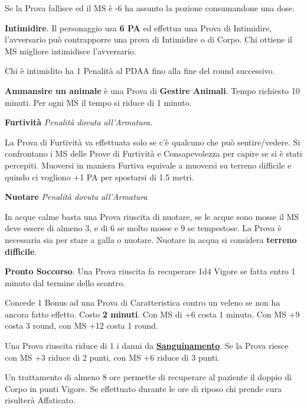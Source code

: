 \documentclass[12pt,a4paper,twoside,openany]{book}
\begin{document}
\begin{multicols}{2}
Se la Prova fallisce ed il MS è -6 ha assunto la pozione consumandone una dose.

\medskip

\textbf{Intimidire}. Il personaggio usa \textbf{6 PA} ed effettua una Prova di Intimidire, l'avversario può contrapporre una prova di Intimidire o di Corpo. Chi ottiene il MS migliore intimidisce l'avversario.

Chi è intimidito ha 1 Penalità al PDAA fino alla fine del round successivo.

\medskip

\textbf{Ammansire un animale} è una Prova di \textbf{Gestire Animali}. Tempo richiesto 10 minuti. Per ogni MS il tempo si riduce di 1 minuto.

\medskip

\textbf{Furtività}  \textit{Penalità dovuta all'Armatura.}

La Prova di Furtività va effettuata solo se c'è qualcuno che può sentire/vedere. Si confrontano i MS delle Prove di Furtività e Consapevolezza per capire se si è stati percepiti. Muoversi in maniera Furtiva equivale a muoversi su terreno difficile e quindo ci vogliono +1 PA per spostarsi di 1.5 metri.

\medskip

\textbf{Nuotare} \textit{Penalità dovuta all'Armatura}

In acque calme basta una Prova riuscita di nuotare, se le acque sono mosse il MS deve essere di almeno 3, e di 6 se molto mosse e 9 se tempestose. La Prova è necessaria sia per stare a galla o nuotare. Nuotare in acqua si considera \textbf{terreno difficile}.

\medskip

\textbf{Pronto Soccorso}\hypertarget{prontosoccorso}{}\label{prontosoccorso}. Una Prova riuscita fa recuperare 1d4 Vigore se fatta entro 1 minuto dal termine dello scontro.

Concede 1 Bonus ad una Prova di Caratteristica contro un veleno se non ha ancora fatto effetto. Costo \textbf{2 minuti}. Con MS di +6 costa 1 minuto. Con MS +9 costa 3 round, con MS +12 costa 1 round.

Una Prova riuscita riduce di 1 i danni da \hyperlink{sanguinamento}{\textbf{Sanguinamento}}. Se la Prova riesce con MS +3 riduce di 2 punti, con MS +6 riduce di 3 punti.

Un trattamento di almeno 8 ore permette di recuperare al paziente il doppio di Corpo in punti Vigore. Se effettuato durante le ore di riposo chi prende cura risulterà Affaticato.


\end{multicols}
\end{document}
